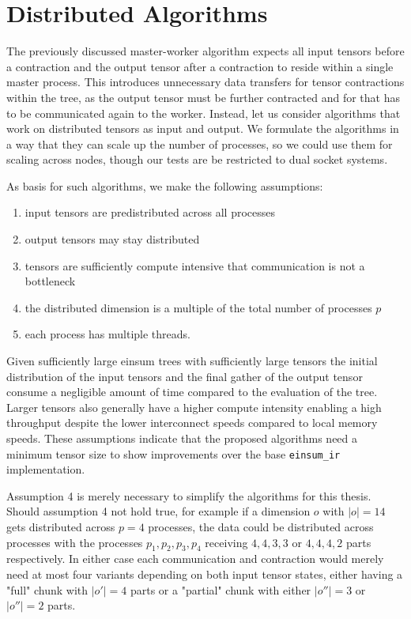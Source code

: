 \section{Distributed Algorithms}
\label{sec:n_nodes}

The previously discussed master-worker algorithm expects all input tensors before a contraction and the output tensor after a contraction to reside within a single master process.
This introduces unnecessary data transfers for tensor contractions within the tree, as the output tensor must be further contracted and for that has to be communicated again to the worker.
Instead, let us consider algorithms that work on distributed tensors as input and output.
We formulate the algorithms in a way that they can scale up the number of processes, so we could use them for scaling across nodes, though our tests are be restricted to dual socket systems.

As basis for such algorithms, we make the following assumptions:
\begin{enumerate}
    \item input tensors are predistributed across all processes
    \item output tensors may stay distributed
    \item tensors are sufficiently compute intensive that communication is not a bottleneck
    \item the distributed dimension is a multiple of the total number of processes $p$
    \item each process has multiple threads.
\end{enumerate}

Given sufficiently large einsum trees with sufficiently large tensors the initial distribution of the input tensors and the final gather of the output tensor consume a negligible amount of time compared to the evaluation of the tree.
Larger tensors also generally have a higher compute intensity enabling a high throughput despite the lower interconnect speeds compared to local memory speeds.
These assumptions indicate that the proposed algorithms need a minimum tensor size to show improvements over the base \texttt{einsum\_ir} implementation.

Assumption 4 is merely necessary to simplify the algorithms for this thesis.
Should assumption 4 not hold true, for example if a dimension $o$ with $|o|=14$ gets distributed across $p=4$ processes, the data could be distributed across processes with the processes $p_1,p_2,p_3,p_4$ receiving $4,4,3,3$ or $4,4,4,2$ parts respectively.
In either case each communication and contraction would merely need at most four variants depending on both input tensor states, either having a "full" chunk with $|o'|=4$ parts or a "partial" chunk with either $|o''|=3$ or $|o''|=2$ parts.


